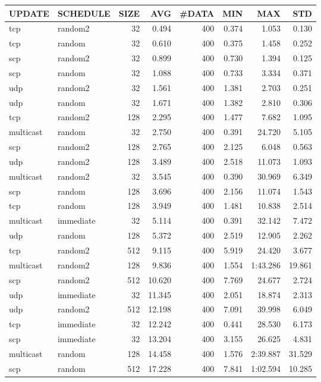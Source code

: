 \begin{tabular}{|l|l|r|r|r|r|r|r|}
\hline
UPDATE & SCHEDULE & SIZE & AVG & \#DATA & MIN & MAX & STD\\
\hline
tcp & random2 & 32 &  0.494 & 400 & 0.374 & 1.053 & 0.130\\
tcp & random & 32 &  0.610 & 400 & 0.375 & 1.458 & 0.252\\
scp & random2 & 32 &  0.899 & 400 & 0.730 & 1.394 & 0.125\\
scp & random & 32 &  1.088 & 400 & 0.733 & 3.334 & 0.371\\
udp & random2 & 32 &  1.561 & 400 & 1.381 & 2.703 & 0.251\\
udp & random & 32 &  1.671 & 400 & 1.382 & 2.810 & 0.306\\
tcp & random2 & 128 &  2.295 & 400 & 1.477 & 7.682 & 1.095\\
multicast & random & 32 &  2.750 & 400 & 0.391 & 24.720 & 5.105\\
scp & random2 & 128 &  2.765 & 400 & 2.125 & 6.048 & 0.563\\
udp & random2 & 128 &  3.489 & 400 & 2.518 & 11.073 & 1.093\\
multicast & random2 & 32 &  3.545 & 400 & 0.390 & 30.969 & 6.349\\
scp & random & 128 &  3.696 & 400 & 2.156 & 11.074 & 1.543\\
tcp & random & 128 &  3.949 & 400 & 1.481 & 10.838 & 2.514\\
multicast & immediate & 32 &  5.114 & 400 & 0.391 & 32.142 & 7.472\\
udp & random & 128 &  5.372 & 400 & 2.519 & 12.905 & 2.262\\
tcp & random2 & 512 &  9.115 & 400 & 5.919 & 24.420 & 3.677\\
multicast & random2 & 128 &  9.836 & 400 & 1.554 & 1:43.286 & 19.861\\
scp & random2 & 512 &  10.620 & 400 & 7.769 & 24.677 & 2.724\\
udp & immediate & 32 &  11.345 & 400 & 2.051 & 18.874 & 2.313\\
udp & random2 & 512 &  12.198 & 400 & 7.091 & 39.998 & 6.049\\
tcp & immediate & 32 &  12.242 & 400 & 0.441 & 28.530 & 6.173\\
scp & immediate & 32 &  13.204 & 400 & 3.155 & 26.625 & 4.831\\
multicast & random & 128 &  14.458 & 400 & 1.576 & 2:39.887 & 31.529\\
scp & random & 512 &  17.228 & 400 & 7.841 & 1:02.594 & 10.285\\

\end{tabular}
